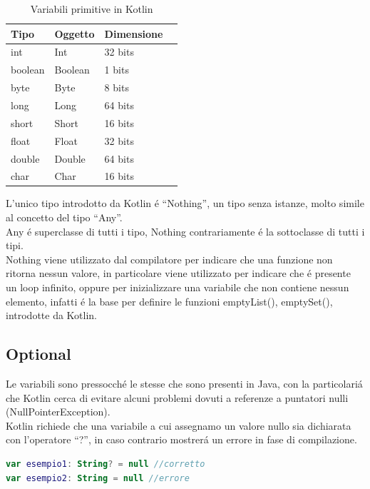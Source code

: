 \begin{table}[h]
\begin{center}
    \begin{tabular}{ | l | l | l | p{5cm} |} \hline
    \textbf{Tipo} & \textbf{Oggetto} & \textbf{Dimensione} \\ \hline
    int & Int & 32 bits\\ \hline
    boolean & Boolean & 1 bits\\ \hline
    byte & Byte & 8 bits\\ \hline
    long & Long & 64 bits\\ \hline
    short & Short & 16 bits\\ \hline
    float & Float & 32 bits\\ \hline
    double & Double & 64 bits\\ \hline
    char & Char & 16 bits\\ \hline
\end{tabular}
\caption[Variabili primitive Kotlin]{Variabili primitive in Kotlin}\label{tab:Variabili primitive in Kotlin}
\end{center}
\end{table}

L'unico tipo introdotto da Kotlin \'e ``Nothing'', un tipo senza istanze, molto simile al concetto del tipo ``Any''.\\
Any \'e superclasse di tutti i tipo, Nothing contrariamente \'e la sottoclasse di tutti i tipi.\\
Nothing viene utilizzato dal compilatore per indicare che una funzione non ritorna nessun valore, in particolare viene utilizzato per indicare che \'e presente un loop infinito, oppure per inizializzare una variabile che non contiene nessun elemento, infatti \'e la base per definire le funzioni emptyList(), emptySet(), introdotte da Kotlin.


\subsection{Optional}
Le variabili sono pressocch\'e le stesse che sono presenti in Java, con la particolari\'a che Kotlin cerca di evitare alcuni problemi dovuti a referenze a puntatori nulli (NullPointerException). \\
Kotlin richiede che una variabile a cui assegnamo un valore nullo sia dichiarata con l'operatore ``?'', in caso contrario mostrer\'a un errore in fase di compilazione.

\begin{lstlisting}[language=kotlin,caption={Esempio 1 Safe call operator Kotlin}]
var esempio1: String? = null //corretto
var esempio2: String = null //errore
\end{lstlisting}

